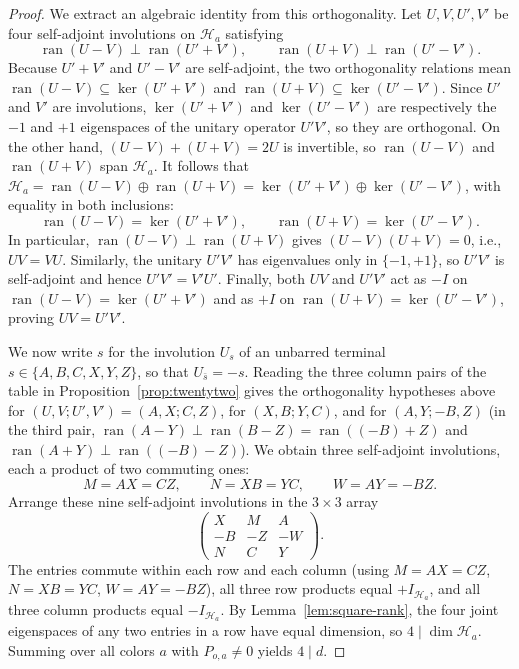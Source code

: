 \begin{proof}
We extract an algebraic identity from this orthogonality. Let $U,V,U',V'$ be four self-adjoint involutions on $\mathcal H_a$ satisfying
\[
 \operatorname{ran}(U-V)\perp\operatorname{ran}(U'+V'),\qquad
 \operatorname{ran}(U+V)\perp\operatorname{ran}(U'-V').
\]
Because $U'+V'$ and $U'-V'$ are self-adjoint, the two orthogonality relations mean $\operatorname{ran}(U-V)\subseteq\ker(U'+V')$ and $\operatorname{ran}(U+V)\subseteq\ker(U'-V')$. Since $U'$ and $V'$ are involutions, $\ker(U'+V')$ and $\ker(U'-V')$ are respectively the $-1$ and $+1$ eigenspaces of the unitary operator $U'V'$, so they are orthogonal. On the other hand, $(U-V)+(U+V)=2U$ is invertible, so $\operatorname{ran}(U-V)$ and $\operatorname{ran}(U+V)$ span $\mathcal H_a$. It follows that $\mathcal H_a=\operatorname{ran}(U-V)\oplus\operatorname{ran}(U+V)=\ker(U'+V')\oplus\ker(U'-V')$, with equality in both inclusions:
\[
 \operatorname{ran}(U-V)=\ker(U'+V'),\qquad \operatorname{ran}(U+V)=\ker(U'-V').
\]
In particular, $\operatorname{ran}(U-V)\perp\operatorname{ran}(U+V)$ gives $(U-V)(U+V)=0$, i.e., $UV=VU$. Similarly, the unitary $U'V'$ has eigenvalues only in $\{-1,+1\}$, so $U'V'$ is self-adjoint and hence $U'V'=V'U'$. Finally, both $UV$ and $U'V'$ act as $-I$ on $\operatorname{ran}(U-V)=\ker(U'+V')$ and as $+I$ on $\operatorname{ran}(U+V)=\ker(U'-V')$, proving $UV=U'V'$.

We now write $s$ for the involution $U_s$ of an unbarred terminal $s\in\{A,B,C,X,Y,Z\}$, so that $U_{\bar s}=-s$. Reading the three column pairs of the table in Proposition~\ref{prop:twentytwo} gives the orthogonality hypotheses above for $(U,V;U',V')=(A,X;C,Z)$, for $(X,B;Y,C)$, and for $(A,Y;-B,Z)$ (in the third pair, $\operatorname{ran}(A-Y)\perp\operatorname{ran}(B-Z)=\operatorname{ran}((-B)+Z)$ and $\operatorname{ran}(A+Y)\perp\operatorname{ran}((-B)-Z)$). We obtain three self-adjoint involutions, each a product of two commuting ones:
\[
 M=AX=CZ,\qquad N=XB=YC,\qquad W=AY=-BZ.
\]
Arrange these nine self-adjoint involutions in the $3\times3$ array
\[
 \begin{pmatrix}
 X&M&A\\
 -B&-Z&-W\\
 N&C&Y
 \end{pmatrix}.
\]
The entries commute within each row and each column (using $M=AX=CZ$, $N=XB=YC$, $W=AY=-BZ$), all three row products equal $+I_{\mathcal H_a}$, and all three column products equal $-I_{\mathcal H_a}$. By Lemma~\ref{lem:square-rank}, the four joint eigenspaces of any two entries in a row have equal dimension, so $4\mid\dim\mathcal H_a$. Summing over all colors $a$ with $P_{o,a}\ne0$ yields $4\mid d$.
\end{proof}
